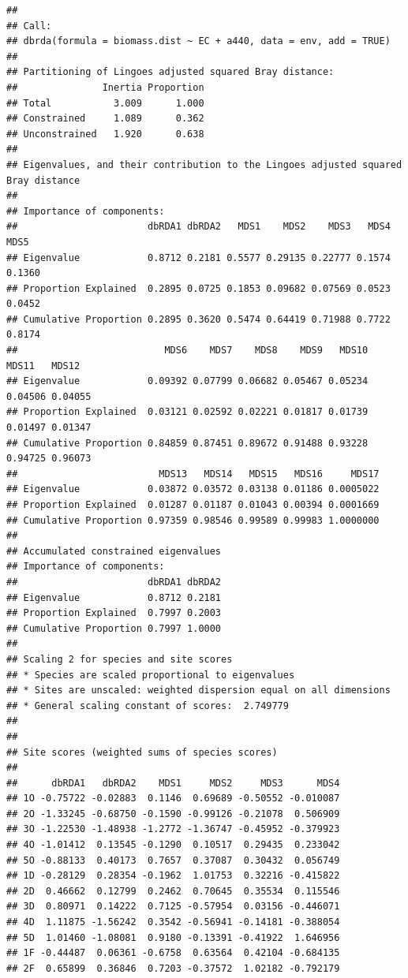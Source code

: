 \documentclass[
]{book}
\begin{document}
\begin{verbatim}
## 
## Call:
## dbrda(formula = biomass.dist ~ EC + a440, data = env, add = TRUE) 
## 
## Partitioning of Lingoes adjusted squared Bray distance:
##               Inertia Proportion
## Total           3.009      1.000
## Constrained     1.089      0.362
## Unconstrained   1.920      0.638
## 
## Eigenvalues, and their contribution to the Lingoes adjusted squared Bray distance 
## 
## Importance of components:
##                       dbRDA1 dbRDA2   MDS1    MDS2    MDS3   MDS4   MDS5
## Eigenvalue            0.8712 0.2181 0.5577 0.29135 0.22777 0.1574 0.1360
## Proportion Explained  0.2895 0.0725 0.1853 0.09682 0.07569 0.0523 0.0452
## Cumulative Proportion 0.2895 0.3620 0.5474 0.64419 0.71988 0.7722 0.8174
##                          MDS6    MDS7    MDS8    MDS9   MDS10   MDS11   MDS12
## Eigenvalue            0.09392 0.07799 0.06682 0.05467 0.05234 0.04506 0.04055
## Proportion Explained  0.03121 0.02592 0.02221 0.01817 0.01739 0.01497 0.01347
## Cumulative Proportion 0.84859 0.87451 0.89672 0.91488 0.93228 0.94725 0.96073
##                         MDS13   MDS14   MDS15   MDS16     MDS17
## Eigenvalue            0.03872 0.03572 0.03138 0.01186 0.0005022
## Proportion Explained  0.01287 0.01187 0.01043 0.00394 0.0001669
## Cumulative Proportion 0.97359 0.98546 0.99589 0.99983 1.0000000
## 
## Accumulated constrained eigenvalues
## Importance of components:
##                       dbRDA1 dbRDA2
## Eigenvalue            0.8712 0.2181
## Proportion Explained  0.7997 0.2003
## Cumulative Proportion 0.7997 1.0000
## 
## Scaling 2 for species and site scores
## * Species are scaled proportional to eigenvalues
## * Sites are unscaled: weighted dispersion equal on all dimensions
## * General scaling constant of scores:  2.749779 
## 
## 
## Site scores (weighted sums of species scores)
## 
##      dbRDA1   dbRDA2    MDS1     MDS2     MDS3      MDS4
## 1O -0.75722 -0.02883  0.1146  0.69689 -0.50552 -0.010087
## 2O -1.33245 -0.68750 -0.1590 -0.99126 -0.21078  0.506909
## 3O -1.22530 -1.48938 -1.2772 -1.36747 -0.45952 -0.379923
## 4O -1.01412  0.13545 -0.1290  0.10517  0.29435  0.233042
## 5O -0.88133  0.40173  0.7657  0.37087  0.30432  0.056749
## 1D -0.28129  0.28354 -0.1962  1.01753  0.32216 -0.415822
## 2D  0.46662  0.12799  0.2462  0.70645  0.35534  0.115546
## 3D  0.80971  0.14222  0.7125 -0.57954  0.03156 -0.446071
## 4D  1.11875 -1.56242  0.3542 -0.56941 -0.14181 -0.388054
## 5D  1.01460 -1.08081  0.9180 -0.13391 -0.41922  1.646956
## 1F -0.44487  0.06361 -0.6758  0.63564  0.42104 -0.684135
## 2F  0.65899  0.36846  0.7203 -0.37572  1.02182 -0.792179

\end{verbatim}
\end{document}
